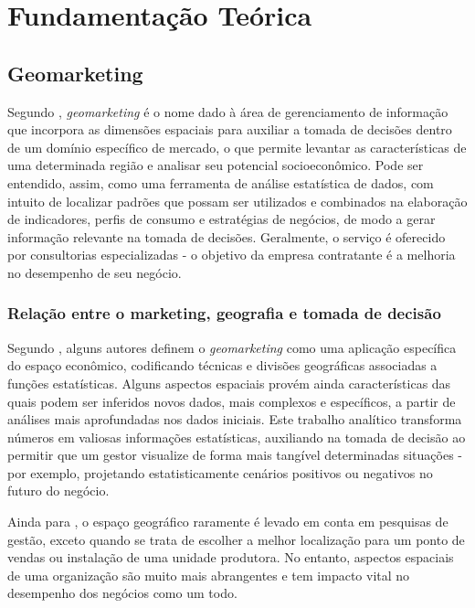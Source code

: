 
\chapter{Fundamentação Teórica}
\label{fundamentacao-teorica}

\section{Geomarketing}
\label{Geom}
Segundo , \emph{geomarketing} é o nome dado à área de
gerenciamento de informação que incorpora as dimensões espaciais para auxiliar a
tomada de decisões dentro de um domínio específico de mercado, o que permite
levantar as características de uma determinada região e analisar seu potencial
socioeconômico. Pode ser entendido, assim, como uma ferramenta de análise
estatística de dados, com intuito de localizar padrões que possam ser utilizados
e combinados na elaboração de indicadores, perfis de consumo e estratégias de
negócios, de modo a gerar informação relevante na tomada de decisões.
Geralmente, o serviço é oferecido por consultorias especializadas - o  objetivo
da empresa contratante é a melhoria no desempenho de seu negócio.

\subsection{Relação entre o marketing, geografia e tomada de decisão}
Segundo , alguns autores definem o \emph{geomarketing} como uma aplicação específica do espaço econômico, codificando técnicas e divisões geográficas associadas a funções estatísticas. Alguns aspectos espaciais provém ainda características das quais podem ser inferidos novos dados, mais complexos e específicos, a partir de análises mais aprofundadas nos dados iniciais. Este trabalho analítico transforma números em valiosas informações estatísticas, auxiliando na tomada de decisão ao permitir que um gestor visualize de forma mais tangível determinadas situações - por exemplo, projetando estatisticamente cenários positivos ou negativos no futuro do negócio.

Ainda para , o espaço geográfico raramente é levado em conta em pesquisas de gestão, exceto quando se trata de escolher a melhor localização para um ponto de vendas ou instalação de uma unidade produtora. No entanto, aspectos espaciais de uma organização são muito mais abrangentes e tem impacto vital no desempenho dos negócios como um todo. 

